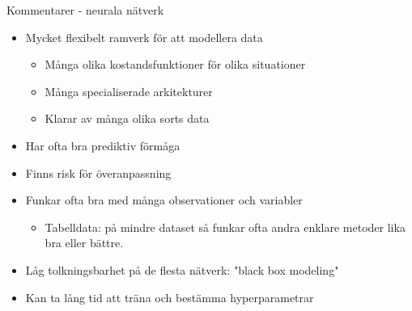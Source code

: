 \documentclass[10pt,english]{beamer}
\begin{document}
\begin{frame}{Kommentarer - neurala nätverk }
    \begin{itemize}
        \item Mycket flexibelt ramverk för att modellera data
          \begin{itemize}
            \item Många olika kostandsfunktioner för olika situationer
            \item Många specialiserade arkitekturer
            \item Klarar av många olika sorts data
          \end{itemize}
        \item Har ofta bra prediktiv förmåga
        \item Finns risk för överanpassning
        \item Funkar ofta bra med många observationer och variabler
        \begin{itemize}
                  \item Tabelldata: på mindre dataset så funkar ofta andra enklare metoder lika bra eller bättre.
        \end{itemize}
        \item Låg tolkningsbarhet på de flesta nätverk: "black box modeling"
        \item Kan ta lång tid att träna och bestämma hyperparametrar
    \end{itemize}
\end{frame}
\end{document}
